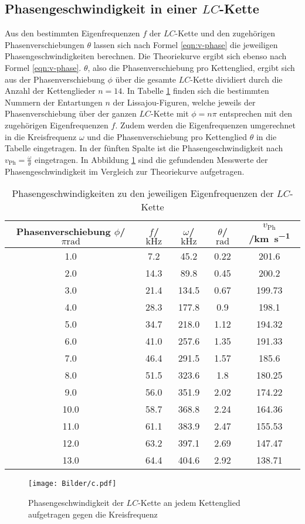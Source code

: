 \FloatBarrier
\subsection{Phasengeschwindigkeit in einer $LC$-Kette}

Aus den bestimmten Eigenfrequenzen $f$ der $LC$-Kette und den zugehörigen Phasenverschiebungen $\theta$ lassen sich nach Formel \eqref{eqn:v-phase} die jeweiligen Phasengeschwindigkeiten berechnen.
Die Theoriekurve ergibt sich ebenso nach Formel \eqref{eqn:v-phase}.
$\theta$, also die Phasenverschiebung pro Kettenglied, ergibt sich aus der Phasenverschiebung $\phi$ über die gesamte $LC$-Kette dividiert durch die Anzahl der Kettenglieder $n=14$.
In Tabelle \ref{tab:c} finden sich die bestimmten Nummern der Entartungen $n$ der Lissajou-Figuren, welche jeweils der Phasenverschiebung über der ganzen $LC$-Kette mit $\phi=n\pi$ entsprechen mit den zugehörigen Eigenfrequenzen $f$.
Zudem werden die Eigenfrequenzen umgerechnet in die Kreisfrequenz $\omega$ und die Phasenverschiebung pro Kettenglied $\theta$ in die Tabelle eingetragen.
In der fünften Spalte ist die Phasengeschwindigkeit nach $v_{\mathrm{Ph}}=\frac{\omega}{\theta}$ eingetragen.
In Abbildung \ref{fig:plotc} sind die gefundenden Messwerte der Phasengeschwindigkeit im Vergleich zur Theoriekurve aufgetragen.
\begin{table}
  \caption{Phasengeschwindigkeiten zu den jeweiligen Eigenfrequenzen der $LC$-Kette}
\label{tab:c}
\centering
\begin{tabular}{ccccc}
\toprule
Phasenverschiebung $\phi$/$\pi\si{\radian}$ & $f$/$\si{\kilo\Hz}$ & $\omega$/$\si{\kilo\Hz}$ & $\theta$/$\si{\radian}$ & $v_{\mathrm{Ph}}$/\si{\kilo\metre\per\second} \\
\midrule
1.0 & 7.2 & 45.2 & 0.22 & 201.6 \\
2.0 & 14.3 & 89.8 & 0.45 & 200.2 \\
3.0 & 21.4 & 134.5 & 0.67 & 199.73 \\
4.0 & 28.3 & 177.8 & 0.9 & 198.1 \\
5.0 & 34.7 & 218.0 & 1.12 & 194.32 \\
6.0 & 41.0 & 257.6 & 1.35 & 191.33 \\
7.0 & 46.4 & 291.5 & 1.57 & 185.6 \\
8.0 & 51.5 & 323.6 & 1.8 & 180.25 \\
9.0 & 56.0 & 351.9 & 2.02 & 174.22 \\
10.0 & 58.7 & 368.8 & 2.24 & 164.36 \\
11.0 & 61.1 & 383.9 & 2.47 & 155.53 \\
12.0 & 63.2 & 397.1 & 2.69 & 147.47 \\
13.0 & 64.4 & 404.6 & 2.92 & 138.71 \\
\bottomrule
\end{tabular}
\end{table}
\begin{figure}
  \centering
 \texttt{[image: Bilder/c.pdf]}
  \caption{Phasengeschwindigkeit der $LC$-Kette an jedem Kettenglied aufgetragen gegen die Kreisfrequenz}
  \label{fig:plotc}
\end{figure}
